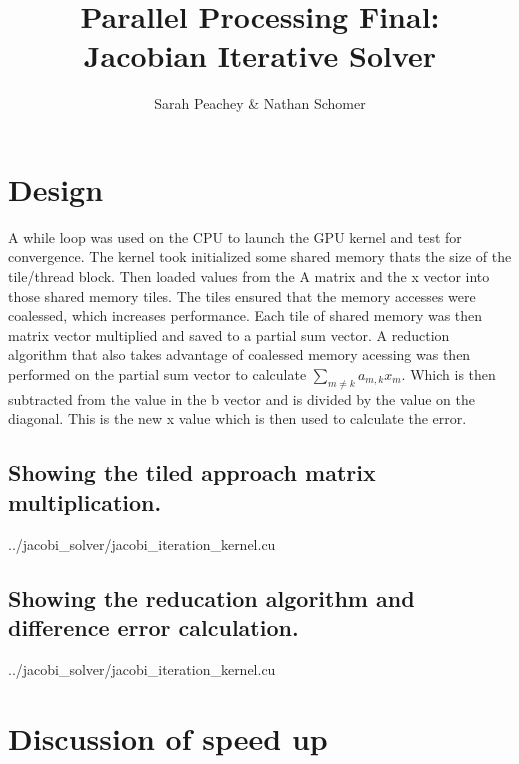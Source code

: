 \documentclass[12pt]{article}
\begin{document}
\title{Parallel Processing Final: \\Jacobian Iterative Solver}
\author{Sarah Peachey \& Nathan Schomer}
\maketitle

\vspace{-1.5cm}
\section{Design}
\vspace{-0.25cm}

\qquad A while loop was used on the CPU to launch the GPU kernel and test
for convergence. The kernel took initialized some shared memory thats the
size of the tile/thread block. Then loaded values from the A matrix and the
x vector into those shared memory tiles. The tiles ensured that the memory
accesses were coalessed, which increases performance. Each tile of shared
memory was then matrix vector multiplied and saved to a partial sum vector.
A reduction algorithm that also takes advantage of coalessed memory acessing 
was then performed on the partial sum vector to
calculate $\sum_{m\neq k}a_{m,k}x_m$. Which is then subtracted from the value
in the b vector and is divided by the value on the diagonal. This is the new
x value which is then used to calculate the error.  

\newpage

\subsection{Showing the tiled approach matrix multiplication.} 

{../jacobi_solver/jacobi_iteration_kernel.cu }

\subsection{Showing the reducation algorithm and difference error calculation.}

{../jacobi_solver/jacobi_iteration_kernel.cu }


\pagebreak
\vspace{-0.6cm}
\section{Discussion of speed up}
\vspace{-0.4cm}
\end{document}
